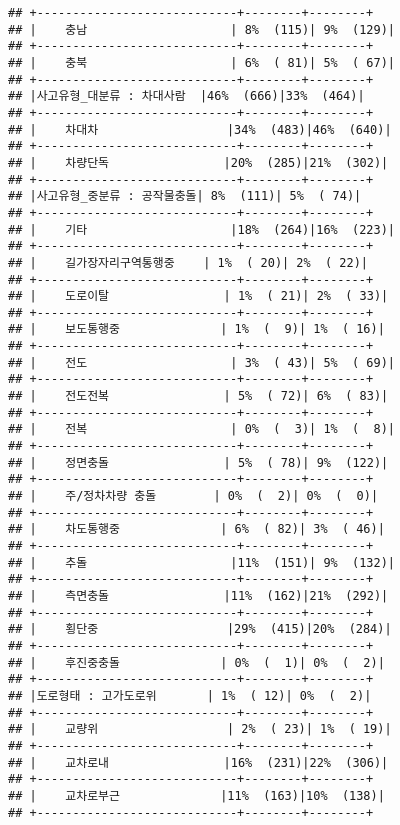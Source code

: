 \documentclass[]{article}
\begin{document}
\begin{verbatim}
## +----------------------------+--------+--------+
## |    충남                    | 8%  (115)| 9%  (129)|
## +----------------------------+--------+--------+
## |    충북                    | 6%  ( 81)| 5%  ( 67)|
## +----------------------------+--------+--------+
## |사고유형_대분류 : 차대사람  |46%  (666)|33%  (464)|
## +----------------------------+--------+--------+
## |    차대차                  |34%  (483)|46%  (640)|
## +----------------------------+--------+--------+
## |    차량단독                |20%  (285)|21%  (302)|
## +----------------------------+--------+--------+
## |사고유형_중분류 : 공작물충돌| 8%  (111)| 5%  ( 74)|
## +----------------------------+--------+--------+
## |    기타                    |18%  (264)|16%  (223)|
## +----------------------------+--------+--------+
## |    길가장자리구역통행중    | 1%  ( 20)| 2%  ( 22)|
## +----------------------------+--------+--------+
## |    도로이탈                | 1%  ( 21)| 2%  ( 33)|
## +----------------------------+--------+--------+
## |    보도통행중              | 1%  (  9)| 1%  ( 16)|
## +----------------------------+--------+--------+
## |    전도                    | 3%  ( 43)| 5%  ( 69)|
## +----------------------------+--------+--------+
## |    전도전복                | 5%  ( 72)| 6%  ( 83)|
## +----------------------------+--------+--------+
## |    전복                    | 0%  (  3)| 1%  (  8)|
## +----------------------------+--------+--------+
## |    정면충돌                | 5%  ( 78)| 9%  (122)|
## +----------------------------+--------+--------+
## |    주/정차차량 충돌        | 0%  (  2)| 0%  (  0)|
## +----------------------------+--------+--------+
## |    차도통행중              | 6%  ( 82)| 3%  ( 46)|
## +----------------------------+--------+--------+
## |    추돌                    |11%  (151)| 9%  (132)|
## +----------------------------+--------+--------+
## |    측면충돌                |11%  (162)|21%  (292)|
## +----------------------------+--------+--------+
## |    횡단중                  |29%  (415)|20%  (284)|
## +----------------------------+--------+--------+
## |    후진중충돌              | 0%  (  1)| 0%  (  2)|
## +----------------------------+--------+--------+
## |도로형태 : 고가도로위       | 1%  ( 12)| 0%  (  2)|
## +----------------------------+--------+--------+
## |    교량위                  | 2%  ( 23)| 1%  ( 19)|
## +----------------------------+--------+--------+
## |    교차로내                |16%  (231)|22%  (306)|
## +----------------------------+--------+--------+
## |    교차로부근              |11%  (163)|10%  (138)|
## +----------------------------+--------+--------+

\end{verbatim}
\end{document}
